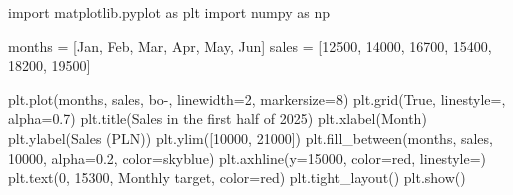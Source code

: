 \documentclass[
  english,
  letterpaper,
  DIV=11,
  numbers=noendperiod]{scrreprt}
\newenvironment{Shaded}{\begin{snugshade}}{\end{snugshade}}
\newcommand{\DecValTok}[1]{\textcolor[rgb]{0.68,0.00,0.00}{#1}}
\newcommand{\FloatTok}[1]{\textcolor[rgb]{0.68,0.00,0.00}{#1}}
\newcommand{\ImportTok}[1]{\textcolor[rgb]{0.00,0.46,0.62}{#1}}
\newcommand{\NormalTok}[1]{\textcolor[rgb]{0.00,0.23,0.31}{#1}}
\newcommand{\OperatorTok}[1]{\textcolor[rgb]{0.37,0.37,0.37}{#1}}
\newcommand{\StringTok}[1]{\textcolor[rgb]{0.13,0.47,0.30}{#1}}
\newcommand{\VariableTok}[1]{\textcolor[rgb]{0.07,0.07,0.07}{#1}}
\begin{document}
\begin{Shaded}
\begin{Highlighting}[]
\ImportTok{import}\NormalTok{ matplotlib.pyplot }\ImportTok{as}\NormalTok{ plt}
\ImportTok{import}\NormalTok{ numpy }\ImportTok{as}\NormalTok{ np}

\NormalTok{months }\OperatorTok{=}\NormalTok{ [}\StringTok{\textquotesingle{}Jan\textquotesingle{}}\NormalTok{, }\StringTok{\textquotesingle{}Feb\textquotesingle{}}\NormalTok{, }\StringTok{\textquotesingle{}Mar\textquotesingle{}}\NormalTok{, }\StringTok{\textquotesingle{}Apr\textquotesingle{}}\NormalTok{, }\StringTok{\textquotesingle{}May\textquotesingle{}}\NormalTok{, }\StringTok{\textquotesingle{}Jun\textquotesingle{}}\NormalTok{]}
\NormalTok{sales }\OperatorTok{=}\NormalTok{ [}\DecValTok{12500}\NormalTok{, }\DecValTok{14000}\NormalTok{, }\DecValTok{16700}\NormalTok{, }\DecValTok{15400}\NormalTok{, }\DecValTok{18200}\NormalTok{, }\DecValTok{19500}\NormalTok{]}

\NormalTok{plt.plot(months, sales, }\StringTok{\textquotesingle{}bo{-}\textquotesingle{}}\NormalTok{, linewidth}\OperatorTok{=}\DecValTok{2}\NormalTok{, markersize}\OperatorTok{=}\DecValTok{8}\NormalTok{)}
\NormalTok{plt.grid(}\VariableTok{True}\NormalTok{, linestyle}\OperatorTok{=}\StringTok{\textquotesingle{}{-}{-}\textquotesingle{}}\NormalTok{, alpha}\OperatorTok{=}\FloatTok{0.7}\NormalTok{)}
\NormalTok{plt.title(}\StringTok{\textquotesingle{}Sales in the first half of 2025\textquotesingle{}}\NormalTok{)}
\NormalTok{plt.xlabel(}\StringTok{\textquotesingle{}Month\textquotesingle{}}\NormalTok{)}
\NormalTok{plt.ylabel(}\StringTok{\textquotesingle{}Sales (PLN)\textquotesingle{}}\NormalTok{)}
\NormalTok{plt.ylim([}\DecValTok{10000}\NormalTok{, }\DecValTok{21000}\NormalTok{])}
\NormalTok{plt.fill\_between(months, sales, }\DecValTok{10000}\NormalTok{, alpha}\OperatorTok{=}\FloatTok{0.2}\NormalTok{, color}\OperatorTok{=}\StringTok{\textquotesingle{}skyblue\textquotesingle{}}\NormalTok{)}
\NormalTok{plt.axhline(y}\OperatorTok{=}\DecValTok{15000}\NormalTok{, color}\OperatorTok{=}\StringTok{\textquotesingle{}red\textquotesingle{}}\NormalTok{, linestyle}\OperatorTok{=}\StringTok{\textquotesingle{}{-}{-}\textquotesingle{}}\NormalTok{)}
\NormalTok{plt.text(}\DecValTok{0}\NormalTok{, }\DecValTok{15300}\NormalTok{, }\StringTok{\textquotesingle{}Monthly target\textquotesingle{}}\NormalTok{, color}\OperatorTok{=}\StringTok{\textquotesingle{}red\textquotesingle{}}\NormalTok{)}
\NormalTok{plt.tight\_layout()}
\NormalTok{plt.show()}
\end{Highlighting}
\end{Shaded}
\end{document}
